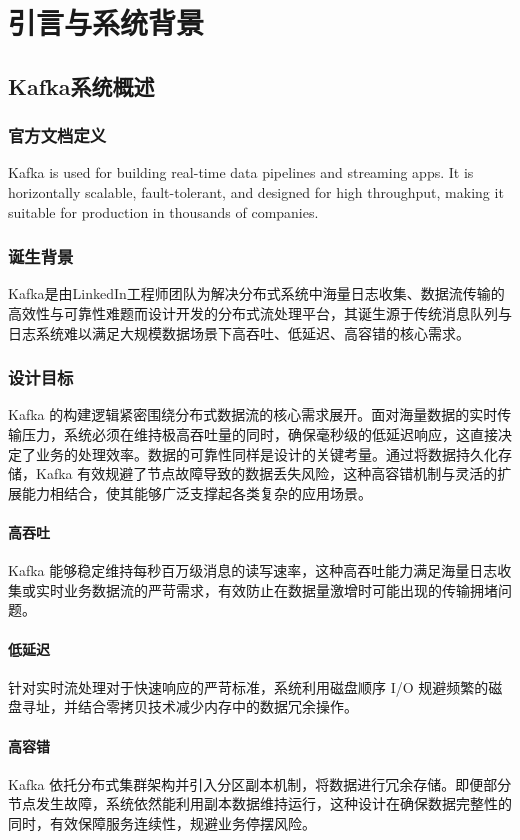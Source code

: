 \section{引言与系统背景}

	\subsection{Kafka系统概述}
		\subsubsection{官方文档定义}
		Kafka is used for building real-time data pipelines and streaming apps. It is horizontally scalable, fault-tolerant, and designed for high throughput, making it suitable for production in thousands of companies.
		\subsubsection{诞生背景}
		Kafka是由LinkedIn工程师团队为解决分布式系统中海量日志收集、数据流传输的高效性与可靠性难题而设计开发的分布式流处理平台，其诞生源于传统消息队列与日志系统难以满足大规模数据场景下高吞吐、低延迟、高容错的核心需求\cite{Raptis_2022}。
		\subsubsection{设计目标}
		Kafka 的构建逻辑紧密围绕分布式数据流的核心需求展开。面对海量数据的实时传输压力，系统必须在维持极高吞吐量的同时，确保毫秒级的低延迟响应，这直接决定了业务的处理效率。数据的可靠性同样是设计的关键考量。通过将数据持久化存储，Kafka 有效规避了节点故障导致的数据丢失风险，这种高容错机制与灵活的扩展能力相结合，使其能够广泛支撑起各类复杂的应用场景。
			\paragraph{高吞吐}
			Kafka 能够稳定维持每秒百万级消息的读写速率，这种高吞吐能力满足海量日志收集或实时业务数据流的严苛需求，有效防止在数据量激增时可能出现的传输拥堵问题。
			\paragraph{低延迟}
			针对实时流处理对于快速响应的严苛标准，系统利用磁盘顺序 I/O 规避频繁的磁盘寻址，并结合零拷贝技术减少内存中的数据冗余操作。
			\paragraph{高容错}
			Kafka 依托分布式集群架构并引入分区副本机制，将数据进行冗余存储。即便部分节点发生故障，系统依然能利用副本数据维持运行，这种设计在确保数据完整性的同时，有效保障服务连续性，规避业务停摆风险。

